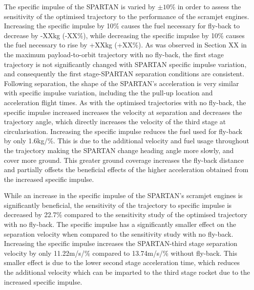 The specific impulse of the SPARTAN is varied by $\pm10\%$ in order to assess the sensitivity of the optimised trajectory to the performance of the scramjet engines.  
Increasing the specific impulse by 10\% causes the fuel necessary for fly-back to decrease by -XXkg (-XX\%), while decreasing the specific impulse by 10\% causes the fuel necessary to rise by +XXkg (+XX\%). 
As was observed in Section XX in the maximum payload-to-orbit trajectory with no fly-back, the first stage trajectory is not significantly changed with SPARTAN specific impulse variation, and consequently the first stage-SPARTAN separation conditions are consistent. Following separation, the shape of the SPARTAN's acceleration is very similar with specific impulse variation, including the the pull-up location and acceleration flight times. As with the optimised trajectories with no fly-back, the specific impulse increased increases the velocity at separation and decreases the trajectory angle, which directly increases the velocity of the third stage at circularisation.
Increasing the specific impulse reduces the fuel used for fly-back by only 1.6kg/\%. 
This is due to the additional velocity and fuel usage throughout the trajectory making the SPARTAN change heading angle more slowly, and cover more ground. This greater ground coverage increases the fly-back distance and partially offsets the beneficial effects of the higher acceleration obtained from the increased specific impulse.

While an increase in the specific impulse of the SPARTAN's scramjet engines is significantly beneficial, the sensitivity of the trajectory to specific impulse is decreased by 22.7\% compared to the sensitivity study of the optimised trajectory with no fly-back. 
The specific impulse has a significantly smaller effect on the separation velocity when compared to the sensitivity study with no fly-back. Increasing the specific impulse increases the SPARTAN-third stage separation velocity by only 11.22m/s/\% compared to 13.74m/s/\% without fly-back.  
This smaller effect is due to the lower second stage acceleration time, which reduces the additional velocity which can be imparted to the third stage rocket due to the increased specific impulse. 






